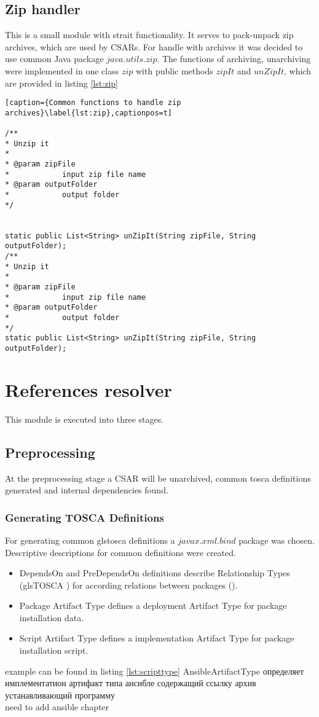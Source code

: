 \subsection*{Zip handler}
This is a small module with strait functionality. It serves to pack-unpack zip archives, which are used by CSARs.
For handle with archives it was decided to use common Java package $java$.$utils$.$zip$.
The functions of archiving, unarchiving were implemented in one class $zip$ with public methods $zipIt$ and $unZipIt$, which are provided in listing \ref{lst:zip}
\begin{lstlisting}[caption={Common functions to handle zip archives}\label{lst:zip},captionpos=t] 

/**
* Unzip it
* 
* @param zipFile
*            input zip file name
* @param outputFolder
*            output folder
*/ 


static public List<String> unZipIt(String zipFile, String outputFolder);
/**
* Unzip it
* 
* @param zipFile
*            input zip file name
* @param outputFolder
*            output folder
*/
static public List<String> unZipIt(String zipFile, String outputFolder);
\end{lstlisting}

\section{References resolver}
This module is executed into three stages.

\subsection*{Preprocessing}
At the preprocessing stage a CSAR will be unarchived, common \gls{tosca} definitions generated and internal dependencies found. 


\subsubsection*{Generating TOSCA Definitions}
For generating common gls{tosca} definitions a $javax$.$xml$.$bind$ package was chosen. 
Descriptive descriptions for common definitions were created.
\begin{itemize}
	\item DependsOn and PreDependsOn definitions describe Relationship Types (gls{TOSCA} ) for according relations between packages (). 
	\item Package Artifact Type defines a deployment Artifact Type for package installation data.
	\item Script Artifact Type defines a implementation Artifact Type for package installation script.
\end{itemize}
example can be found in listing \ref{lst:scripttype}
AnsibleArtifactType  определяет имплементатион артифакт типа ансибле содержащий ссылку архив устанавливающий программу 
\\need to add ansible chapter
\fi

